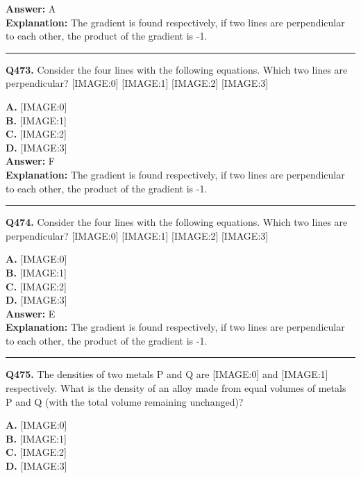 \documentclass[12pt]{article}
\begin{document}
\textbf{Answer:} A \\
\textbf{Explanation:} The gradient is found respectively, if two lines are perpendicular to each other, the product of the gradient is -1.

\hrule
\vspace{1em}


\noindent
\textbf{Q473.} Consider the four lines with the following equations.
Which two lines are perpendicular?
[IMAGE:0]
[IMAGE:1]
[IMAGE:2]
[IMAGE:3]



\textbf{A.} [IMAGE:0] \\
\textbf{B.} [IMAGE:1] \\
\textbf{C.} [IMAGE:2] \\
\textbf{D.} [IMAGE:3] \\

\textbf{Answer:} F \\
\textbf{Explanation:} The gradient is found respectively, if two lines are perpendicular to each other, the product of the gradient is -1.

\hrule
\vspace{1em}


\noindent
\textbf{Q474.} Consider the four lines with the following equations.
Which two lines are perpendicular?
[IMAGE:0]
[IMAGE:1]
[IMAGE:2]
[IMAGE:3]



\textbf{A.} [IMAGE:0] \\
\textbf{B.} [IMAGE:1] \\
\textbf{C.} [IMAGE:2] \\
\textbf{D.} [IMAGE:3] \\

\textbf{Answer:} E \\
\textbf{Explanation:} The gradient is found respectively, if two lines are perpendicular to each other, the product of the gradient is -1.

\hrule
\vspace{1em}


\noindent
\textbf{Q475.} The densities of two metals P and Q are
[IMAGE:0]
and
[IMAGE:1]
respectively. What is the density of an alloy made from equal volumes of metals P and Q (with the total volume remaining unchanged)?



\textbf{A.} [IMAGE:0] \\
\textbf{B.} [IMAGE:1] \\
\textbf{C.} [IMAGE:2] \\
\textbf{D.} [IMAGE:3] \\
\end{document}
